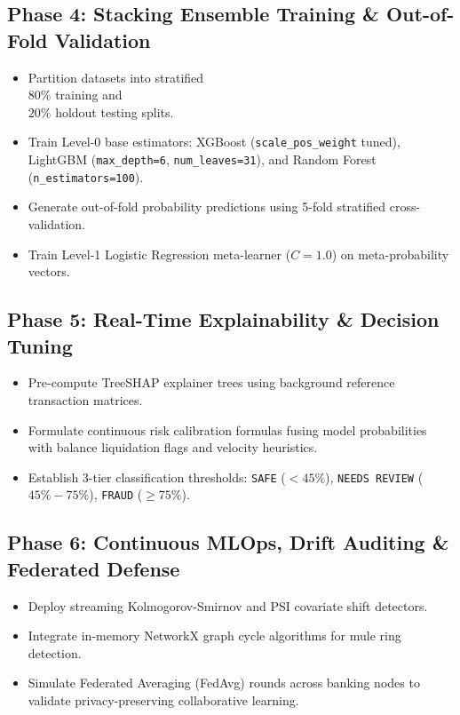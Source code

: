 \documentclass[12pt,a4paper,oneside]{report}
\begin{document}
\subsection{Phase 4: Stacking Ensemble Training \& Out-of-Fold Validation}
\begin{itemize}[leftmargin=0.35in]
\item Partition datasets into stratified \\$80\%$ training and \\$20\%$ holdout testing splits.
\item Train Level-0 base estimators: XGBoost (\texttt{scale\_pos\_weight} tuned), LightGBM (\texttt{max\_depth=6}, \texttt{num\_leaves=31}), and Random Forest (\texttt{n\_estimators=100}).
\item Generate out-of-fold probability predictions using 5-fold stratified cross-validation.
\item Train Level-1 Logistic Regression meta-learner ($C=1.0$) on meta-probability vectors.
\end{itemize}

\subsection{Phase 5: Real-Time Explainability \& Decision Tuning}
\begin{itemize}[leftmargin=0.35in]
\item Pre-compute TreeSHAP explainer trees using background reference transaction matrices.
\item Formulate continuous risk calibration formulas fusing model probabilities with balance liquidation flags and velocity heuristics.
\item Establish 3-tier classification thresholds: \texttt{SAFE} ($< 45\%$), \texttt{NEEDS REVIEW} (\\$45\%-75\%$), \texttt{FRAUD} ($\ge 75\%$).
\end{itemize}

\subsection{Phase 6: Continuous MLOps, Drift Auditing \& Federated Defense}
\begin{itemize}[leftmargin=0.35in]
\item Deploy streaming Kolmogorov-Smirnov and PSI covariate shift detectors.
\item Integrate in-memory NetworkX graph cycle algorithms for mule ring detection.
\item Simulate Federated Averaging (FedAvg) rounds across banking nodes to validate privacy-preserving collaborative learning.
\end{itemize}
\end{document}
